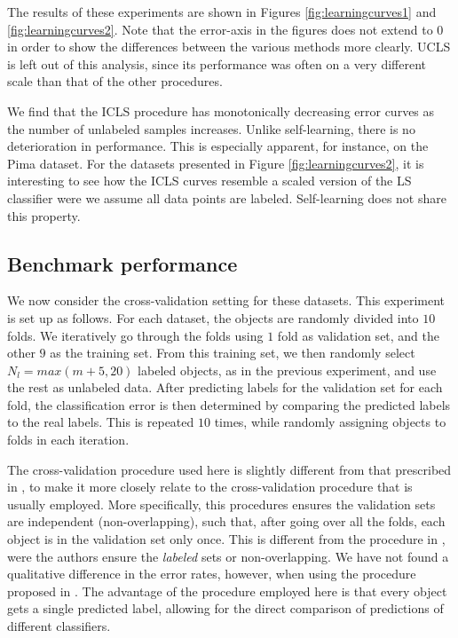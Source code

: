 \documentclass[smallcondensed]{svjour3}
\begin{document}
The results of these experiments are shown in Figures \ref{fig:learningcurves1} and \ref{fig:learningcurves2}. Note that the error-axis in the figures does not extend to $0$ in order to show the differences between the various methods more clearly. UCLS is left out of this analysis, since its performance was often on a very different scale than that of the other procedures.

We find that the ICLS procedure has monotonically decreasing error curves as the number of unlabeled samples increases. Unlike self-learning, there is no deterioration in performance. This is especially apparent, for instance, on the Pima dataset. For the datasets presented in Figure \ref{fig:learningcurves2}, it is interesting to see how the ICLS curves resemble a scaled version of the LS classifier were we assume all data points are labeled. Self-learning does not share this property.


\subsection{Benchmark performance}
We now consider the cross-validation setting for these datasets. This experiment is set up as follows. For each dataset, the objects are randomly divided into $10$ folds. We iteratively go through the folds using $1$ fold as validation set, and the other $9$ as the training set. From this training set, we then randomly select $N_l=max(m+5,20)$ labeled objects, as in the previous experiment, and use the rest as unlabeled data. After predicting labels for the validation set for each fold, the classification error is then determined by comparing the predicted labels to the real labels. This is repeated $10$ times, while randomly assigning objects to folds in each iteration.

The cross-validation procedure used here is slightly different from that prescribed in \cite{Chapelle2006}, to make it more closely relate to the cross-validation procedure that is usually employed. More specifically, this procedures ensures the validation sets are independent (non-overlapping), such that, after going over all the folds, each object is in the validation set only once. This is different from the procedure in \cite{Chapelle2006}, were the authors ensure the \emph{labeled} sets or non-overlapping. We have not found a qualitative difference in the error rates, however, when using the procedure proposed in \cite{Chapelle2006}. The advantage of the procedure employed here is that every object gets a single predicted label, allowing for the direct comparison of predictions of different classifiers.
\end{document}
